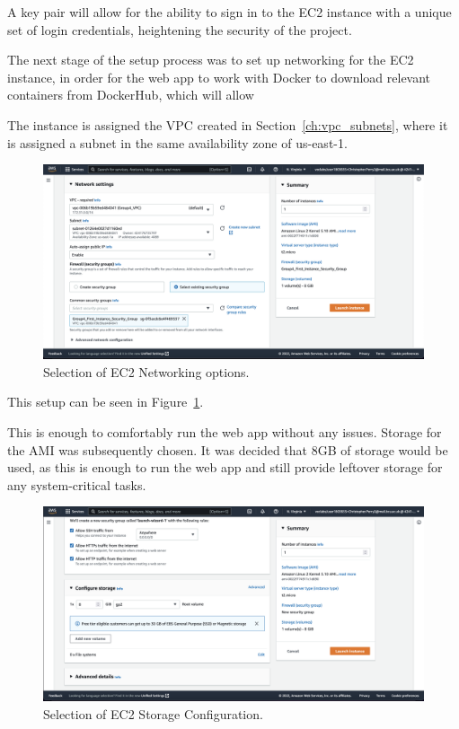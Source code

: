 A key pair will allow for the ability to sign in to the EC2 instance with a unique set of login credentials, heightening
the security of the project.

The next stage of the setup process was to set up networking for the EC2 instance, in order for the web app to work with
Docker to download relevant containers from DockerHub, which will allow

The instance is assigned the VPC created in Section~\ref{ch:vpc_subnets}, where it is assigned a subnet in the same
availability zone of us-east-1.

\begin{figure}[!htbp]
    \centering
    \includegraphics[scale=0.3]{resources/ec2/create-instance-network-settings}
    \caption{Selection of EC2 Networking options.}
    \label{fig:ec2-networking}
\end{figure}

This setup can be seen in Figure~\ref{fig:ec2-networking}.

This is enough to comfortably run the web app without any issues.
Storage for the AMI was subsequently chosen.
It was decided that 8GB of storage would be used, as this is enough to run the web app and still provide leftover storage
for any system-critical tasks.

\begin{figure}[!htbp]
    \centering
    \includegraphics[scale=0.3]{resources/ec2/create-instance-configure-storage}
    \caption{Selection of EC2 Storage Configuration.}
    \label{fig:ec2-storage}
\end{figure}

